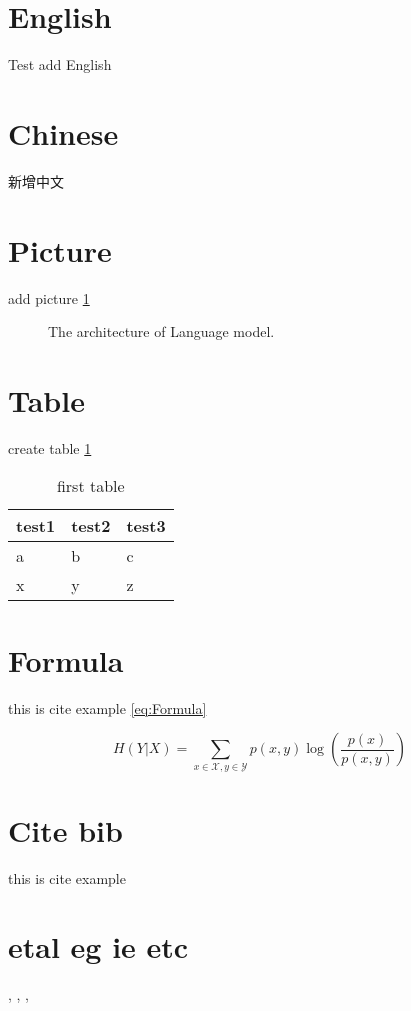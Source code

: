 \section{English}
Test add English

\section{Chinese}
新增中文

\section{Picture}
add picture \ref{fig:SystemDesign}

\begin{figure}[h!]
\centerline{}
\caption{The architecture of Language model.}
\label{fig:SystemDesign}
\end{figure}

\section{Table}
create table \ref{tab:my-table}

\begin{table}[]
\centering
\caption{first table}
\label{tab:my-table}
\begin{tabular}{lll}
\hline
test1 & test2 & test3 \\ \hline
a     & b     & c     \\ \hline
x     & y     & z     \\ \hline
\end{tabular}
\end{table}


\section{Formula}
this is cite example \ref{eq:Formula}

\begin{equation}\label{eq:Formula}
    H(Y | X)=\sum_{x \in \mathcal{X}, y \in \mathcal{Y}} p(x, y) \log \left(\frac{p(x)}{p(x, y)}\right)
\end{equation}\label{eq:Formula}

\section{Cite bib}
this is cite example \cite{Bi-LSTM}

\section{etal eg ie etc}
\etal, \eg, \ie, \etc